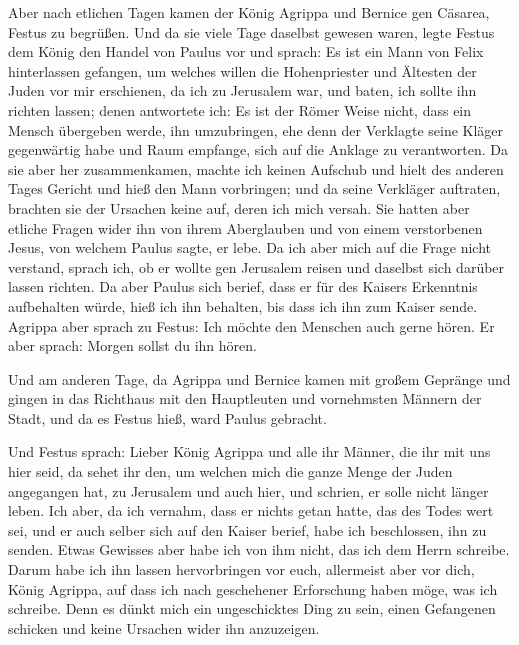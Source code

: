  Aber nach etlichen Tagen kamen der König Agrippa und
Bernice gen Cäsarea, Festus zu begrüßen.  Und da sie
viele Tage daselbst gewesen waren, legte Festus dem König den Handel von
Paulus vor und sprach: Es ist ein Mann von Felix hinterlassen gefangen,
 um welches willen die Hohenpriester und Ältesten der
Juden vor mir erschienen, da ich zu Jerusalem war, und baten, ich sollte
ihn richten lassen;  denen antwortete ich: Es ist der
Römer Weise nicht, dass ein Mensch übergeben werde, ihn umzubringen, ehe
denn der Verklagte seine Kläger gegenwärtig habe und Raum empfange, sich
auf die Anklage zu verantworten.  Da sie aber her
zusammenkamen, machte ich keinen Aufschub und hielt des anderen Tages
Gericht und hieß den Mann vorbringen;  und da seine
Verkläger auftraten, brachten sie der Ursachen keine auf, deren ich mich
versah.  Sie hatten aber etliche Fragen wider ihn von
ihrem Aberglauben und von einem verstorbenen Jesus, von welchem Paulus
sagte, er lebe.  Da ich aber mich auf die Frage nicht
verstand, sprach ich, ob er wollte gen Jerusalem reisen und daselbst
sich darüber lassen richten.  Da aber Paulus sich berief,
dass er für des Kaisers Erkenntnis aufbehalten würde, hieß ich ihn
behalten, bis dass ich ihn zum Kaiser sende.  Agrippa
aber sprach zu Festus: Ich möchte den Menschen auch gerne hören. Er aber
sprach: Morgen sollst du ihn hören.

 Und am anderen Tage, da Agrippa und Bernice kamen mit
großem Gepränge und gingen in das Richthaus mit den Hauptleuten und
vornehmsten Männern der Stadt, und da es Festus hieß, ward Paulus
gebracht.

 Und Festus sprach: Lieber König Agrippa und alle ihr
Männer, die ihr mit uns hier seid, da sehet ihr den, um welchen mich die
ganze Menge der Juden angegangen hat, zu Jerusalem und auch hier, und
schrien, er solle nicht länger leben.  Ich aber, da ich
vernahm, dass er nichts getan hatte, das des Todes wert sei, und er auch
selber sich auf den Kaiser berief, habe ich beschlossen, ihn zu senden.
 Etwas Gewisses aber habe ich von ihm nicht, das ich dem
Herrn schreibe. Darum habe ich ihn lassen hervorbringen vor euch,
allermeist aber vor dich, König Agrippa, auf dass ich nach geschehener
Erforschung haben möge, was ich schreibe.  Denn es dünkt
mich ein ungeschicktes Ding zu sein, einen Gefangenen schicken und keine
Ursachen wider ihn anzuzeigen.

